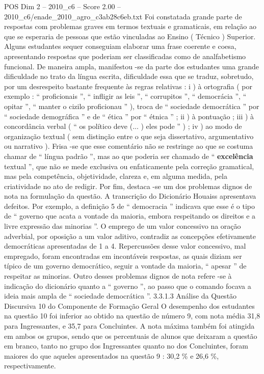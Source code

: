\begin{textsample}{POS Dim 2 – 2010\_c6 – Score 2.00 – 2010\_c6/enade\_2010\_agro\_c3ab28c6eb.txt}
Foi constatada grande parte de respostas com problemas graves em termos textuais e gramaticais, em relação ao que se esperaria de pessoas que estão vinculadas ao Ensino ( Técnico ) Superior.
Alguns estudantes sequer conseguiam elaborar uma frase coerente e coesa, apresentando respostas que poderiam ser classificadas como de analfabetismo funcional.
De maneira ampla, manifestou -se da parte dos estudantes uma grande dificuldade no trato da língua escrita, dificuldade essa que se traduz, sobretudo, por um desrespeito bastante frequente às regras relativas : i ) à ortografia ( por exemplo : “ proficionais ”, “ infligir as leis ”, “ corrupitos ”, “ democrácia ”, “ opitar ”, “ manter o cizilo proficionau ” ), troca de “ sociedade democrática ” por “ sociedade demográfica ” e de “ ética ” por “ étnica ” ; ii ) à pontuação ; iii ) à concordância verbal ( “ os político deve (... ) eles pode ” ) ; iv ) ao modo de organização textual ( sem distinção entre o que seja dissertativo, argumentativo ou narrativo ).
Frisa -se que esse comentário não se restringe ao que se costuma chamar de “ língua padrão ”, mas ao que poderia ser chamado de “ \textbf{excelência} textual ”, que não se mede exclusiva ou enfaticamente pela correção gramatical, mas pela competência, objetividade, clareza e, em alguma medida, pela criatividade no ato de redigir.
Por fim, destaca -se um dos problemas dignos de nota na formulação da questão.
A transcrição do Dicionário Houaiss apresentava defeitos.
Por exemplo, a definição 5 de “ democracia ” indicava que esse é o tipo de “ governo que acata a vontade da maioria, embora respeitando os direitos e a livre expressão das minorias ”.
O emprego de um valor concessivo na oração adverbial, por oposição a um valor aditivo, contradiz as concepções efetivamente democráticas apresentadas de 1 a 4.
Repercussões desse valor concessivo, mal empregado, foram encontradas em incontáveis respostas, as quais diziam ser típico de um governo democrático, seguir a vontade da maioria, “ apesar ” de respeitar as minorias.
Outro desses problemas dignos de nota refere -se à indicação do dicionário quanto a “ governo ”, ao passo que o comando focava a ideia mais ampla de “ sociedade democrática ”. 3.3.1.3 Análise da Questão Discursiva 10 do Componente de Formação Geral O desempenho dos estudantes na questão 10 foi inferior ao obtido na questão de número 9, com nota média 31,8 para Ingressantes, e 35,7 para Concluintes.
A nota máxima também foi atingida em ambos os grupos, sendo que os percentuais de alunos que deixaram a questão em branco, tanto no grupo dos Ingressantes quanto no dos Concluintes, foram maiores do que aqueles apresentados na questão 9 : 30,2 \% e 26,6 \%, respectivamente.

\end{textsample}
